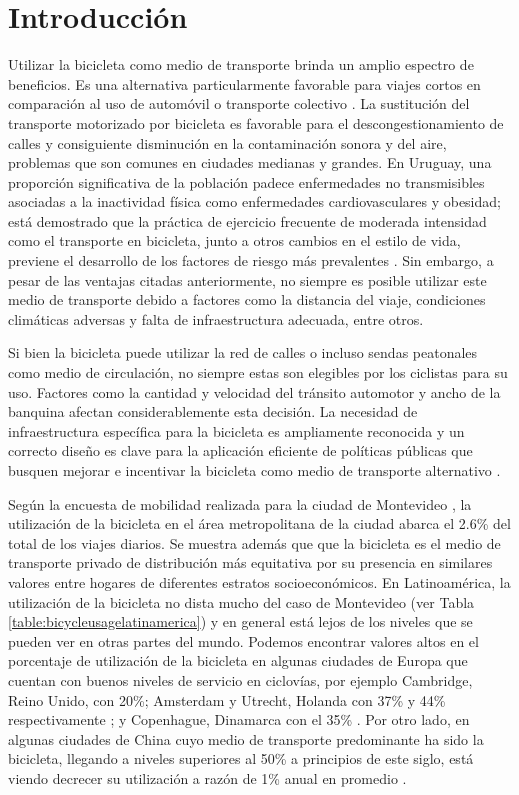 \chapter{Introducción}

  Utilizar la bicicleta como medio de transporte brinda un amplio espectro de beneficios. Es una alternativa particularmente favorable para viajes cortos en comparación al uso de automóvil o transporte colectivo \cite{Hull2014}. La sustitución del transporte motorizado por bicicleta es favorable para el descongestionamiento de calles y consiguiente disminución en la contaminación sonora y del aire, problemas que son comunes en ciudades medianas y grandes. En Uruguay, una proporción significativa de la población padece enfermedades no transmisibles asociadas a la inactividad física como enfermedades cardiovasculares y obesidad; está demostrado que la práctica de ejercicio frecuente de moderada intensidad como el transporte en bicicleta, junto a otros cambios en el estilo de vida, previene el desarrollo de los factores de riesgo más prevalentes \cite{heartrisksuy} \cite{mspphisicalactivityguid} \cite{mspsurveyriskfactors}. Sin embargo, a pesar de las ventajas citadas anteriormente, no siempre es posible utilizar este medio de transporte debido a factores como la distancia del viaje, condiciones climáticas adversas y falta de infraestructura adecuada, entre otros.

  Si bien la bicicleta puede utilizar la red de calles o incluso sendas peatonales como medio de circulación, no siempre estas son elegibles por los ciclistas para su uso. Factores como la cantidad y velocidad del tránsito automotor y ancho de la banquina afectan considerablemente esta decisión. La necesidad de infraestructura específica para la bicicleta es ampliamente reconocida y un correcto diseño es clave para la aplicación eficiente de políticas públicas que busquen mejorar e incentivar la bicicleta como medio de transporte alternativo \cite{Hunt2007}.

  Según la encuesta de mobilidad realizada para la ciudad de Montevideo \cite{Mauttone2017a}, la utilización de la bicicleta en el área metropolitana de la ciudad abarca el 2.6\% del total de los viajes diarios. Se muestra además que que la bicicleta es el medio de transporte privado de distribución más equitativa por su presencia en similares valores entre hogares de diferentes estratos socioeconómicos. En Latinoamérica, la utilización de la bicicleta no dista mucho del caso de Montevideo (ver Tabla \ref{table:bicycleusagelatinamerica}) y en general está lejos de los niveles que se pueden ver en otras partes del mundo. Podemos encontrar valores altos en el porcentaje de utilización de la bicicleta en algunas ciudades de Europa que cuentan con buenos niveles de servicio en ciclovías, por ejemplo Cambridge, Reino Unido, con 20\%; Amsterdam y Utrecht, Holanda con 37\% y 44\% respectivamente \cite{Hull2014}; y Copenhague, Dinamarca con el 35\% \cite{Vedel2017}. Por otro lado, en algunas ciudades de China cuyo medio de transporte predominante ha sido la bicicleta, llegando a niveles superiores al 50\% a principios de este siglo, está viendo decrecer su utilización a razón de 1\% anual en promedio \cite{Li2017}.

